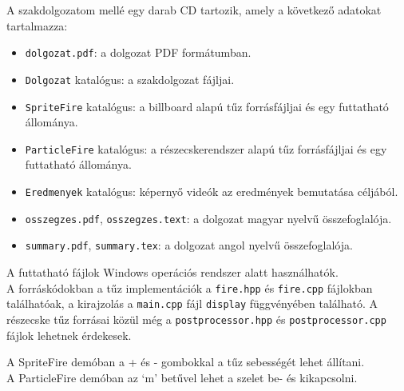 
A szakdolgozatom mellé egy darab CD tartozik, amely a következő adatokat tartalmazza:
\begin{itemize}
\item \texttt{dolgozat.pdf}: a dolgozat PDF formátumban.
\item \texttt{Dolgozat} katalógus: a szakdolgozat fájljai.
\item \texttt{SpriteFire} katalógus: a billboard alapú tűz forrásfájljai és egy futtatható állománya.
\item \texttt{ParticleFire} katalógus: a részecskerendszer alapú tűz forrásfájljai és egy futtatható állománya.
\item \texttt{Eredmenyek} katalógus: képernyő videók az eredmények bemutatása céljából.
\item \texttt{osszegzes.pdf}, \texttt{osszegzes.text}: a dolgozat magyar nyelvű összefoglalója.
\item \texttt{summary.pdf}, \texttt{summary.tex}: a dolgozat angol nyelvű összefoglalója.
\end{itemize}

A futtatható fájlok Windows operációs rendszer alatt használhatók.\\
A forráskódokban a tűz implementációk a \texttt{fire.hpp} és \texttt{fire.cpp} fájlokban találhatóak, a kirajzolás a \texttt{main.cpp} fájl \texttt{display} függvényében található. A részecske tűz forrásai közül még a \texttt{postprocessor.hpp} és \texttt{postprocessor.cpp} fájlok lehetnek érdekesek. 

A SpriteFire demóban a + és - gombokkal a tűz sebességét lehet állítani.\\
A ParticleFire demóban az `m' betűvel lehet a szelet be- és kikapcsolni.




